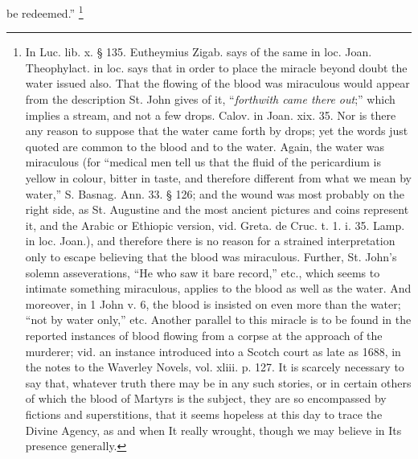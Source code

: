 be redeemed.'' \footnote{In Luc. lib. x. § 135. Eutheymius Zigab. says of the same in loc.
Joan. Theophylact. in loc. says that in order to place the miracle
beyond doubt the water issued also. That the flowing of the blood was
miraculous would appear from the description St. John gives of it, ``\emph{forthwith
came there out};'' which implies a stream, and not a few drops.
Calov. in Joan. xix. 35. Nor is there any reason to suppose that the
water came forth by drops; yet the words just quoted are common to the
blood and to the water. Again, the water was miraculous (for ``medical
men tell us that the fluid of the pericardium is yellow in colour,
bitter in taste, and therefore different from what we mean by water,''
S. Basnag. Ann. 33. § 126; and the wound was most probably on the
right side, as St. Augustine and the most ancient pictures and coins
represent it, and the Arabic or Ethiopic version, vid. Greta. de Cruc.
t. 1. i. 35. Lamp. in loc. Joan.), and therefore there is no reason
for a strained interpretation only to escape believing that the blood
was miraculous. Further, St. John's solemn asseverations, ``He who saw
it bare record,'' etc., which seems to intimate something miraculous,
applies to the blood as well as the water. And moreover, in 1 John v.
6, the blood is insisted on even more than the water; ``not by water
only,'' etc. Another parallel to this miracle is to be found in the
reported instances of blood flowing from a corpse at the approach of
the murderer; vid. an instance introduced into a Scotch court as late
as 1688, in the notes to the Waverley Novels, vol. xliii. p. 127. It
is scarcely necessary to say that, whatever truth there may be in any
such stories, or in certain others of which the blood of Martyrs is
the subject, they are so encompassed by fictions and superstitions,
that it seems hopeless at this day to trace the Divine Agency, as and
when It really wrought, though we may believe in Its presence
generally.}

